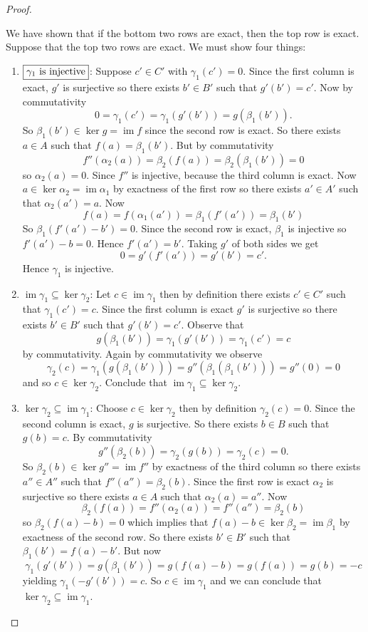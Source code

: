 \documentclass[8pt]{amsart}
\theoremstyle{plain}%
\theoremstyle{definition}
\theoremstyle{remark}
\numberwithin{equation}{section}
\newcommand{\im}{\operatorname{im}}
\begin{document}
\begin{proof}
\begin{enumerate}
		\end{enumerate}
		We have shown that if the bottom two rows are exact, then the top row is exact.\\

		Suppose that the top two rows are exact. We must show four things:
		\begin{enumerate}
			\item $\boxed{\gamma_1$ is injective$}$: Suppose $c' \in C'$  with $\gamma_1(c') = 0$. Since the first column is exact, $g'$ is surjective so there exists $b' \in B'$ such that $g'(b') = c'$. Now by commutativity $$0 = \gamma_1(c') = \gamma_1(g'(b')) = g(\beta_1(b')).$$ So $\beta_1(b') \in \ker g = \im f$ since the second row is exact. So there exists $a \in A$ such that $f(a) = \beta_1(b')$. But by commutativity $$f''(\alpha_2(a)) = \beta_2(f(a)) = \beta_2(\beta_1(b')) = 0$$ so $\alpha_2(a) = 0$. Since $f''$ is injective, because the third column is exact. Now $a \in \ker \alpha_2 = \im \alpha_1$ by exactness of the first row so there exists $a' \in A'$ such that $\alpha_2(a') = a$. Now $$f(a) = f(\alpha_1(a')) = \beta_1(f'(a')) = \beta_1(b')$$ So $\beta_1(f'(a') - b') = 0$. Since the second row is exact, $\beta_1$ is injective so $f'(a') - b = 0$. Hence $f'(a') = b'$. Taking $g'$ of both sides we get $$ 0 = g'(f'(a')) = g'(b') = c'.$$ Hence $\gamma_1$ is injective.
			\item $\boxed{\im \gamma_1 \subseteq \ker \gamma_2}$: Let $c \in \im \gamma_1$ then by definition there exists $c' \in C'$ such that $\gamma_1(c') = c$. Since the first column is exact $g'$ is surjective so there exists $b' \in B'$ such that $g'(b') = c'$. Observe that $$g(\beta_1(b')) = \gamma_1(g'(b')) = \gamma_1(c') = c$$ by commutativity. Again by commutativity we observe $$\gamma_2(c) = \gamma_1(g(\beta_1(b'))) = g''(\beta_1(\beta_1(b'))) = g''(0) = 0$$ and so $c \in \ker \gamma_2$. Conclude that $\im \gamma_1 \subseteq \ker \gamma_2$.
			\item $\boxed{\ker \gamma_2 \subseteq \im \gamma_1}$: Choose $c \in \ker \gamma_2$ then by definition $\gamma_2(c) = 0$. Since the second column is exact, $g$ is surjective. So there exists $b \in B$ such that $g(b) = c$. By commutativity $$g''(\beta_2(b)) = \gamma_2(g(b)) = \gamma_2(c) = 0.$$ So $\beta_2(b) \in \ker g'' = \im f''$ by exactness of the third column so there exists $a'' \in A''$ such that $f''(a'') = \beta_2(b)$. Since the first row is exact $\alpha_2$ is surjective so there exists $a \in A$ such that $\alpha_2(a) = a''$. Now $$\beta_2(f(a)) = f''(\alpha_2(a)) = f''(a'') = \beta_2(b)$$ so $\beta_2(f(a) - b) = 0$ which implies that $f(a) - b \in \ker \beta_2 = \im \beta_1$ by exactness of the second row. So there exists $b' \in B'$ such that $\beta_1(b') = f(a) - b'$. But now $$ \gamma_1(g'(b')) = g(\beta_1(b')) = g(f(a) - b) = g(f(a)) = g(b) = -c$$ yielding $\gamma_1(-g'(b')) = c$. So $c \in \im \gamma_1$ and we can conclude that $\ker \gamma_2 \subseteq \im \gamma_1$.

\end{enumerate}
\end{proof}
\end{document}
